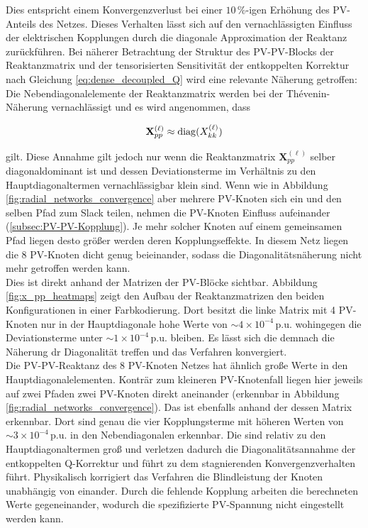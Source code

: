 Dies entspricht einem Konvergenzverlust bei einer $10\,\%$-igen Erhöhung des PV-Anteils des Netzes.
Dieses Verhalten lässt sich auf den vernachlässigten Einfluss der elektrischen Kopplungen durch die diagonale Approximation der Reaktanz zurückführen.
Bei näherer Betrachtung der Struktur des PV-PV-Blocks der Reaktanzmatrix und der tensorisierten Sensitivität der entkoppelten Korrektur nach Gleichung \eqref{eq:dense_decoupled_Q} wird eine relevante Näherung getroffen: Die Nebendiagonalelemente der Reaktanzmatrix werden bei der Thévenin-Näherung vernachlässigt und es wird angenommen, dass 

\begin{equation}
	\mathbf{X}^{(\ell)}_{pp} \approx
	\operatorname{diag}(X^{(\ell)}_{kk})
\end{equation}

gilt. Diese Annahme gilt jedoch nur wenn die Reaktanzmatrix $\mathbf{X}^{(\ell)}_{pp}$ selber diagonaldominant ist und dessen Deviationsterme im Verhältnis zu den Hauptdiagonaltermen vernachlässigbar klein sind.
Wenn wie in Abbildung \ref{fig:radial_networks_convergence} aber mehrere PV-Knoten sich ein und den selben Pfad zum Slack teilen, nehmen die PV-Knoten Einfluss aufeinander (\cref{subsec:PV-PV-Kopplung}).
Je mehr solcher Knoten auf einem gemeinsamen Pfad liegen desto größer werden deren Kopplungseffekte.
In diesem Netz liegen die 8 PV-Knoten dicht genug beieinander, sodass die Diagonalitätsnäherung nicht mehr getroffen werden kann.\\

Dies ist direkt anhand der Matrizen der PV-Blöcke sichtbar.
Abbildung \ref{fig:x_pp_heatmaps} zeigt den Aufbau der Reaktanzmatrizen den beiden Konfigurationen in einer Farbkodierung.
Dort besitzt die linke Matrix mit 4 PV-Knoten nur in der Hauptdiagonale hohe Werte von $\sim4\times10^{-4}\,\mathrm{p.u.}$ wohingegen die Deviationsterme unter $\sim1\times10^{-4}\,\mathrm{p.u.}$ bleiben. 
Es lässt sich die demnach die Näherung dr Diagonalität treffen und das Verfahren konvergiert.\\


Die PV-PV-Reaktanz des 8 PV-Knoten Netzes hat ähnlich große Werte in den Hauptdiagonalelementen. 
Konträr zum kleineren PV-Knotenfall liegen hier jeweils auf zwei Pfaden zwei PV-Knoten direkt aneinander (erkennbar in Abbildung \ref{fig:radial_networks_convergence}). 
Das ist ebenfalls anhand der dessen Matrix erkennbar.
Dort sind genau die vier Kopplungsterme mit höheren Werten von $\sim3\times10^{-4}\,\mathrm{p.u.}$ in den Nebendiagonalen erkennbar. 
Die sind relativ zu den Hauptdiagonaltermen groß und verletzen dadurch die Diagonalitätsannahme der entkoppelten Q-Korrektur und führt zu dem stagnierenden Konvergenzverhalten führt.
Physikalisch korrigiert das Verfahren die Blindleistung der Knoten unabhängig von einander. 
Durch die fehlende Kopplung arbeiten die berechneten Werte gegeneinander, wodurch die spezifizierte PV-Spannung nicht eingestellt werden kann.\\


